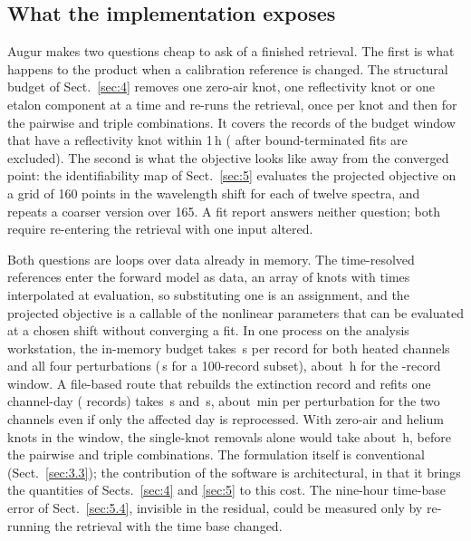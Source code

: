 \subsection{What the implementation exposes}
\label{sec:2.9}

Augur makes two questions cheap to ask of a finished retrieval. The first is what happens to the product when a
calibration reference is changed. The structural budget of Sect.~\ref{sec:4} removes one zero-air knot, one
reflectivity knot or one etalon component at a time and re-runs the retrieval, once per knot and then for the pairwise
and triple combinations. It covers the  records of the budget window that have a reflectivity knot within
1\,h ( after bound-terminated fits are excluded). The second is what the objective looks like away from
the converged point: the identifiability map of Sect.~\ref{sec:5} evaluates the projected objective on a grid of 160
points in the wavelength shift for each of twelve spectra, and repeats a coarser version over 165. A fit report
answers neither question; both require re-entering the retrieval with one input altered.

Both questions are loops over data already in memory. The time-resolved references enter the forward model as data,
an array of knots with times interpolated at evaluation, so substituting one is an assignment, and the projected
objective is a callable of the nonlinear parameters that can be evaluated at a chosen shift without converging a fit.
In one process on the analysis workstation, the in-memory budget takes \,s per record for both heated channels
and all four perturbations (\,s for a 100-record subset), about \,h for the -record window. A file-based
route that rebuilds the extinction record and refits one channel-day ( records) takes \,s and \,s, about
\,min per perturbation for the two channels even if only the affected day is reprocessed. With  zero-air and
 helium knots in the window, the single-knot removals alone would take about \,h, before the pairwise and
triple combinations. The formulation itself is conventional (Sect.~\ref{sec:3.3}); the contribution of the software is
architectural, in that it brings the quantities of Sects.~\ref{sec:4} and \ref{sec:5} to this cost. The nine-hour time-base error of Sect.~\ref{sec:5.4}, invisible in the residual, could be measured only
by re-running the retrieval with the time base changed.
